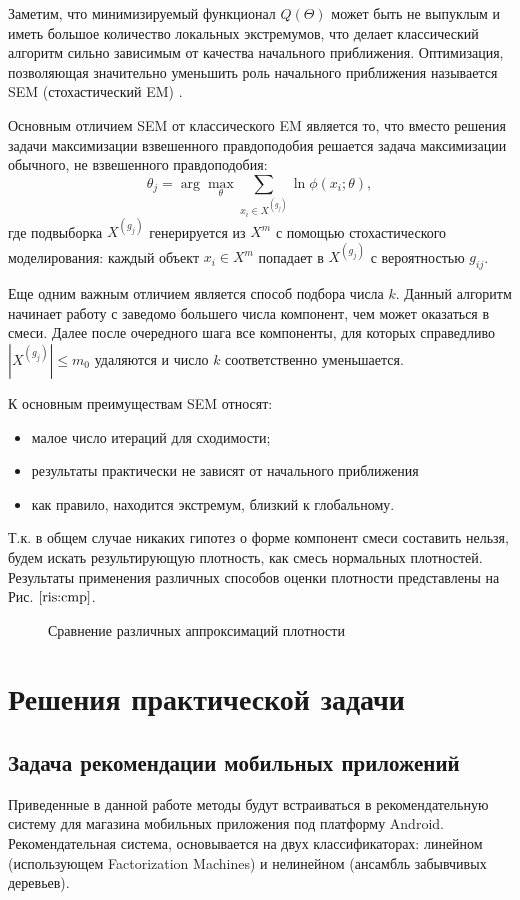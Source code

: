 \documentclass[12pt,a4paper]{report}
\begin{document}
Заметим, что минимизируемый функционал $Q(\Theta)$ может быть не выпуклым и иметь большое количество локальных экстремумов, что делает классический алгоритм сильно зависимым от качества начального приближения. Оптимизация, позволяющая значительно уменьшить роль начального приближения называется SEM (стохастический EM) \cite{Sem}.

Основным отличием SEM от классического EM является то, что вместо решения задачи максимизации взвешенного правдоподобия решается задача максимизации обычного, не взвешенного правдоподобия:
\begin{equation*}
\theta_j = \arg \max_{\theta} \sum_{x_i \in X^{(g_j)}} \ln \phi(x_i; \theta),
\end{equation*}
где подвыборка $X^{(g_j)}$ генерируется из $X^m$ с помощью стохастического моделирования: каждый объект $x_i \in X^m$ попадает в $X^{(g_j)}$ с вероятностью $g_{ij}$.

Еще одним важным отличием является способ подбора числа $k$. Данный алгоритм начинает работу с заведомо большего числа компонент, чем может оказаться в смеси. Далее после очередного шага все компоненты, для которых справедливо $|X^{(g_j)}| \le m_0$ удаляются и число $k$ соответственно уменьшается.

К основным преимуществам SEM относят:
\begin{itemize}
\item малое число итераций для сходимости;
\item результаты практически не зависят от начального приближения
\item как правило, находится экстремум, близкий к глобальному.
\end{itemize}

Т.к. в общем случае никаких гипотез о форме компонент смеси составить нельзя, будем искать результирующую плотность, как смесь нормальных плотностей. Результаты применения различных способов оценки плотности представлены на Рис.  $\ref{ris:cmp}$.

\begin{figure}[H]
\caption{Сравнение различных аппроксимаций плотности}
\label{ris:cmp}
\end{figure}


\chapter{Решения практической задачи}
\section{Задача рекомендации мобильных приложений}
Приведенные в данной работе методы будут встраиваться в рекомендательную систему для магазина мобильных приложения под платформу Android. Рекомендательная система, основывается на двух классификаторах: линейном (использующем Factorization Machines) и нелинейном (ансамбль забывчивых деревьев).
\end{document}
